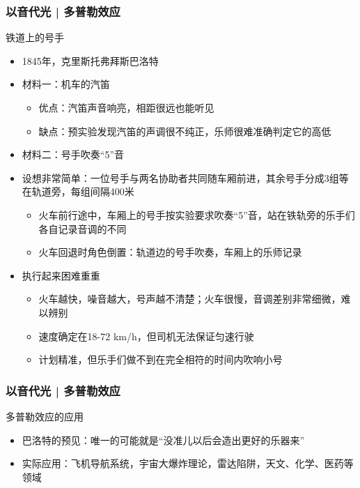 \begin{frame}
  \frametitle{以音代光 | 多普勒效应}
  \begin{block}{铁道上的号手}
    \begin{itemize}
      \item 1845年，克里斯托弗\textbullet 拜斯\textbullet 巴洛特
      \item 材料一：机车的汽笛
        \begin{itemize}
          \item 优点：汽笛声音响亮，相距很远也能听见
          \item 缺点：预实验发现汽笛的声调很不纯正，乐师很难准确判定它的高低
        \end{itemize}
      \item 材料二：号手吹奏“5”音
      \item 设想非常简单：一位号手与两名协助者共同随车厢前进，其余号手分成3组等在轨道旁，每组间隔400米 
        \begin{itemize}
          \item 火车前行途中，车厢上的号手按实验要求吹奏“5”音，站在铁轨旁的乐手们各自记录音调的不同
          \item 火车回退时角色倒置：轨道边的号手吹奏，车厢上的乐师记录
        \end{itemize}
      \item 执行起来困难重重
        \begin{itemize}
          \item 火车越快，噪音越大，号声越不清楚；火车很慢，音调差别非常细微，难以辨别
          \item 速度确定在18-72 km/h，但司机无法保证匀速行驶
          \item 计划精准，但乐手们做不到在完全相符的时间内吹响小号
        \end{itemize}
    \end{itemize}
  \end{block}
\end{frame}

\begin{frame}
  \frametitle{以音代光 | 多普勒效应}
  \begin{block}{多普勒效应的应用}
    \begin{itemize}
      \item 巴洛特的预见：唯一的可能就是“没准儿以后会造出更好的乐器来”
      \item 实际应用：飞机导航系统，宇宙大爆炸理论，雷达陷阱，天文、化学、医药等领域
    \end{itemize}
  \end{block}
\end{frame}

